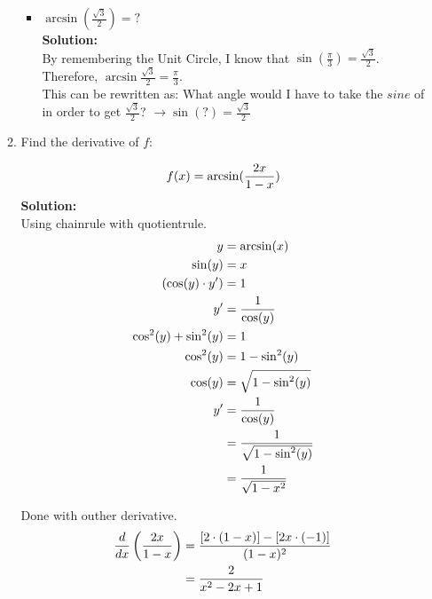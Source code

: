 \documentclass[a4paper]{article}
\begin{document}
\begin{enumerate}
\begin{enumerate}
\begin{itemize}
	\item 	$\arcsin(\frac{\sqrt{3}}{2}) = ?$\\
	\textbf{Solution:}\\	
	
By remembering the Unit Circle, I know that $\sin(\frac{\pi}{3}) = \frac{\sqrt{3}}{2}$. Therefore, $\arcsin\frac{\sqrt{3}}{2} = \frac{\pi}{3}$.\\	
	

This can be rewritten as: What angle would I have to take the $sine$ of in order to get $\frac{\sqrt{3}}{2}$?
$\rightarrow \sin(?) = \frac{\sqrt{3}}{2}$\\


\end{itemize}	
	

	

	



	\item Find the derivative of $f$:
	
	\begin{align*}
		f(x) = \arcsin(\frac{2x}{1-x})\notag
	\end{align*}
\textbf{Solution:}\\

Using chainrule with quotientrule.\\

\begin{align*}
	y &= \arcsin(x)\notag\\
	\sin(y) &= x\notag\\
	(\cos(y) \cdot y') &= 1\notag\\
	y' &= \frac{1}{\cos(y)}\notag\\
	\cos^2(y) + \sin^2(y) &= 1\notag\\
	\cos^2(y) &= 1 - \sin^2(y)\notag\\
	\cos(y) &= \sqrt{1 - \sin^2(y)}\notag\\
	y' &= \frac{1}{\cos(y)}\notag\\
	&= \frac{1}{\sqrt{1 - \sin^2(y)}}\notag\\
	&= \frac{1}{\sqrt{1 - x^2}}\notag
\end{align*}

Done with outher derivative.\\


\begin{align*}
	\frac{d}{dx}\left( \frac{2x}{1-x}\right) &= \frac{\left[ 2 \cdot (1-x) \right] - \left[ 2x \cdot (-1)\right]}{(1-x)^2}\notag\\
	&= \frac{2}{x^2 - 2x +1}\notag
\end{align*}


\end{enumerate}
\end{enumerate}
\end{document}
